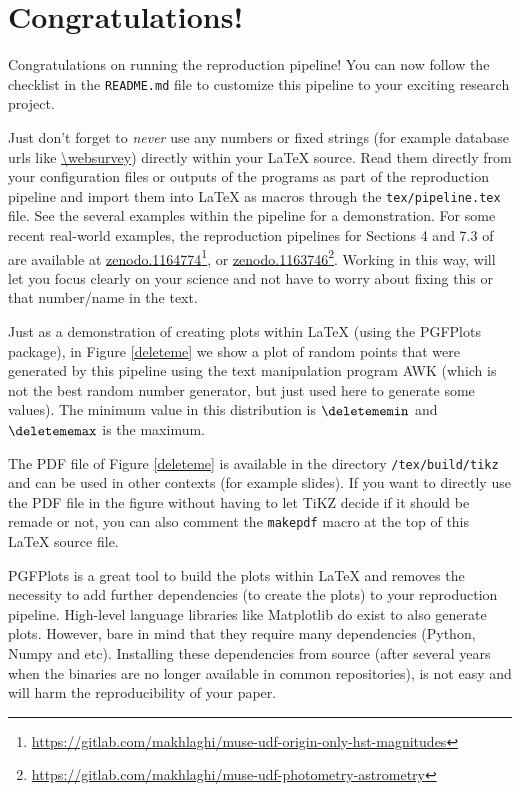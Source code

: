 \documentclass[twocolumn]{article}
\begin{document}
\maketitle

\section{Congratulations!}
Congratulations on running the reproduction pipeline! You can now follow
the checklist in the \texttt{README.md} file to customize this pipeline to
your exciting research project.

Just don't forget to \emph{never} use any numbers or fixed strings (for
example database urls like \url{\websurvey}) directly within your \LaTeX{}
source. Read them directly from your configuration files or outputs of the
programs as part of the reproduction pipeline and import them into \LaTeX{}
as macros through the \texttt{tex/pipeline.tex} file. See the several
examples within the pipeline for a demonstration. For some recent
real-world examples, the reproduction pipelines for Sections 4 and 7.3 of
\citet{bacon17} are available at
\href{https://doi.org/10.5281/zenodo.1164774}{zenodo.1164774}\footnote{\url{https://gitlab.com/makhlaghi/muse-udf-origin-only-hst-magnitudes}},
or
\href{https://doi.org/10.5281/zenodo.1163746}{zenodo.1163746}\footnote{\url{https://gitlab.com/makhlaghi/muse-udf-photometry-astrometry}}. Working
in this way, will let you focus clearly on your science and not have to
worry about fixing this or that number/name in the text.

Just as a demonstration of creating plots within \LaTeX{} (using the
PGFPlots package), in Figure \ref{deleteme} we show a plot of
\deletemenum{} random points that were generated by this pipeline using the
text manipulation program {\small AWK} (which is not the best random number
generator, but just used here to generate some values). The minimum value
in this distribution is $\deletememin$ and $\deletememax$ is the maximum.

The {\small PDF} file of Figure \ref{deleteme} is available in the
directory \texttt{\bdir/tex/build/tikz} and can be used in other contexts
(for example slides). If you want to directly use the PDF file in the
figure without having to let TiKZ decide if it should be remade or not, you
can also comment the \texttt{makepdf} macro at the top of this \LaTeX{}
source file.

PGFPlots is a great tool to build the plots within \LaTeX{} and removes the
necessity to add further dependencies (to create the plots) to your
reproduction pipeline. High-level language libraries like Matplotlib do
exist to also generate plots. However, bare in mind that they require many
dependencies (Python, Numpy and etc). Installing these dependencies from
source (after several years when the binaries are no longer available in
common repositories), is not easy and will harm the reproducibility of your
paper.
\end{document}
